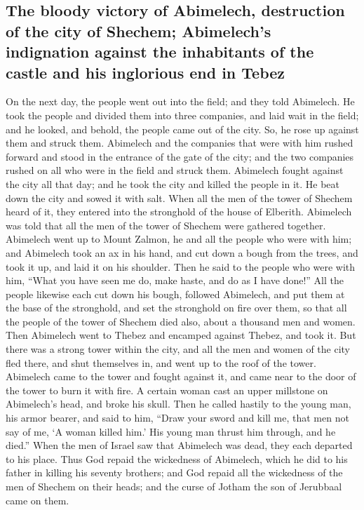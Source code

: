 \hypertarget{the-bloody-victory-of-abimelech-destruction-of-the-city-of-shechem-abimelechs-indignation-against-the-inhabitants-of-the-castle-and-his-inglorious-end-in-tebez}{%
\subsection{The bloody victory of Abimelech, destruction of the city of
Shechem; Abimelech's indignation against the inhabitants of the castle
and his inglorious end in
Tebez}\label{the-bloody-victory-of-abimelech-destruction-of-the-city-of-shechem-abimelechs-indignation-against-the-inhabitants-of-the-castle-and-his-inglorious-end-in-tebez}}

 On the next day, the people went out into the field; and
they told Abimelech.  He took the people and divided them
into three companies, and laid wait in the field; and he looked, and
behold, the people came out of the city. So, he rose up against them and
struck them.  Abimelech and the companies that were with
him rushed forward and stood in the entrance of the gate of the city;
and the two companies rushed on all who were in the field and struck
them.  Abimelech fought against the city all that day;
and he took the city and killed the people in it. He beat down the city
and sowed it with salt.  When all the men of the tower of
Shechem heard of it, they entered into the stronghold of the house of
Elberith.  Abimelech was told that all the men of the
tower of Shechem were gathered together.  Abimelech went
up to Mount Zalmon, he and all the people who were with him; and
Abimelech took an ax in his hand, and cut down a bough from the trees,
and took it up, and laid it on his shoulder. Then he said to the people
who were with him, ``What you have seen me do, make haste, and do as I
have done!''  All the people likewise each cut down his
bough, followed Abimelech, and put them at the base of the stronghold,
and set the stronghold on fire over them, so that all the people of the
tower of Shechem died also, about a thousand men and women.
 Then Abimelech went to Thebez and encamped against
Thebez, and took it.  But there was a strong tower within
the city, and all the men and women of the city fled there, and shut
themselves in, and went up to the roof of the tower. 
Abimelech came to the tower and fought against it, and came near to the
door of the tower to burn it with fire.  A certain woman
cast an upper millstone on Abimelech's head, and broke his skull.
 Then he called hastily to the young man, his armor
bearer, and said to him, ``Draw your sword and kill me, that men not say
of me, `A woman killed him.' His young man thrust him through, and he
died.''  When the men of Israel saw that Abimelech was
dead, they each departed to his place.  Thus God repaid
the wickedness of Abimelech, which he did to his father in killing his
seventy brothers;  and God repaid all the wickedness of
the men of Shechem on their heads; and the curse of Jotham the son of
Jerubbaal came on them.

